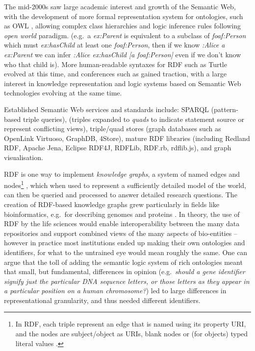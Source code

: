 The mid-2000s saw large academic interest and growth of the Semantic Web, with the development of more formal representation system for ontologies, such as OWL \cite{w3-owl2-overview}, allowing complex class hierarchies and logic inference rules following \emph{open world} paradigm. (e.g.~a \emph{ex:Parent} is equivalent to a subclass of \emph{foaf:Person} which must \emph{ex:hasChild} at least one \emph{foaf:Person}, then if we know \emph{:Alice a ex:Parent} we can infer \emph{:Alice ex:hasChild {[}a foaf:Person{]}} even if we don't know who that child is). More human-readable syntaxes for RDF such as Turtle evolved at this time, and conferences such as  \cite{horrocksSemanticWebISWC2002} gained traction, with a large interest in knowledge representation and logic systems based on Semantic Web technologies evolving at the same time.

Established Semantic Web services and standards include: SPARQL \cite{w3-sparql11-overview} (pattern-based triple queries),  \cite{w3-rdf11-concepts} (triples expanded to \emph{quads} to indicate statement source or represent conflicting views), triple/quad stores (graph databases such as OpenLink Virtuoso, GraphDB, 4Store), mature RDF libraries (including Redland RDF, Apache Jena, Eclipse RDF4J, RDFLib, RDF.rb, rdflib.js), and graph visualisation.

RDF is one way to implement \emph{knowledge graphs}, a system of named edges and nodes\footnote{In RDF, each triple represent an edge that is named using its property URI, and the nodes are subject/object as URIs, blank nodes or (for objects) typed literal values \cite{w3-rdf11-primer}.} \cite{nurdiati2008}, which when used to represent a sufficiently detailed model of the world, can then be queried and processed to answer detailed research questions.
The creation of RDF-based knowledge graphs grew particularly in fields like bioinformatics, e.g.~for describing genomes and proteins \cite{gobleStateNationData2008c,williamsOpenPHACTSSemantic2012c}. In theory, the use of RDF by the life sciences would enable interoperability between the many data repositories and support combined views of the many aspects of bio-entities -- however in practice most institutions ended up making their own ontologies and identifiers, for what to the untrained eye would mean roughly the same. One can argue that the toll of adding the semantic logic system of rich ontologies meant that small, but fundamental, differences in opinion (e.g.~\emph{should a gene identifier signify just the particular DNA sequence letters, or those letters as they appear in a particular position on a human chromosome?}) led to large differences in representational granularity, and thus needed different identifiers.

